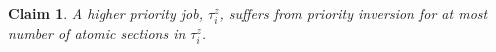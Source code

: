\documentclass[conference]{sig-alternate}
\newtheorem{clm}{Claim}
\begin{document}
\begin{clm}
\label{priority_inversion}
A higher priority job, $\tau_i^z$, suffers from priority inversion for at most number of atomic sections in $\tau_i^z$.
\end{clm}

\end{document}
